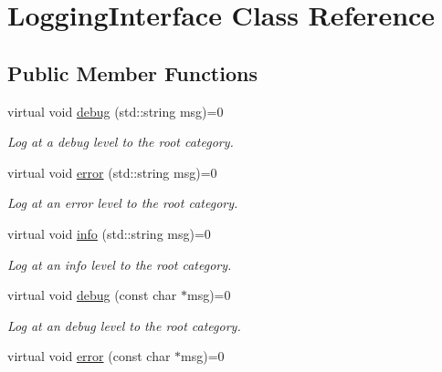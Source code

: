 \hypertarget{classLoggingInterface}{\section{Logging\-Interface Class Reference}
\label{classLoggingInterface}
}
\subsection*{Public Member Functions}
\begin{DoxyCompactItemize}
\item 
\hypertarget{classLoggingInterface_a94e666bf17b42a65c03aff86cbe04978}{virtual void \hyperlink{classLoggingInterface_a94e666bf17b42a65c03aff86cbe04978}{debug} (std\-::string msg)=0}\label{classLoggingInterface_a94e666bf17b42a65c03aff86cbe04978}

\begin{DoxyCompactList}\small\item\em Log at a debug level to the root category. \end{DoxyCompactList}\item 
\hypertarget{classLoggingInterface_a86ba6616c2163d8cb49bed70def8b862}{virtual void \hyperlink{classLoggingInterface_a86ba6616c2163d8cb49bed70def8b862}{error} (std\-::string msg)=0}\label{classLoggingInterface_a86ba6616c2163d8cb49bed70def8b862}

\begin{DoxyCompactList}\small\item\em Log at an error level to the root category. \end{DoxyCompactList}\item 
\hypertarget{classLoggingInterface_a5d994f7cfafe81171954409df64d77ce}{virtual void \hyperlink{classLoggingInterface_a5d994f7cfafe81171954409df64d77ce}{info} (std\-::string msg)=0}\label{classLoggingInterface_a5d994f7cfafe81171954409df64d77ce}

\begin{DoxyCompactList}\small\item\em Log at an info level to the root category. \end{DoxyCompactList}\item 
\hypertarget{classLoggingInterface_a82c2727fb66531d5eec19e39bed79671}{virtual void \hyperlink{classLoggingInterface_a82c2727fb66531d5eec19e39bed79671}{debug} (const char $\ast$msg)=0}\label{classLoggingInterface_a82c2727fb66531d5eec19e39bed79671}

\begin{DoxyCompactList}\small\item\em Log at an debug level to the root category. \end{DoxyCompactList}\item 
\hypertarget{classLoggingInterface_a1cea9e37dae316f39e171654e5e0dc0f}{virtual void \hyperlink{classLoggingInterface_a1cea9e37dae316f39e171654e5e0dc0f}{error} (const char $\ast$msg)=0}\label{classLoggingInterface_a1cea9e37dae316f39e171654e5e0dc0f}


\end{DoxyCompactItemize}
